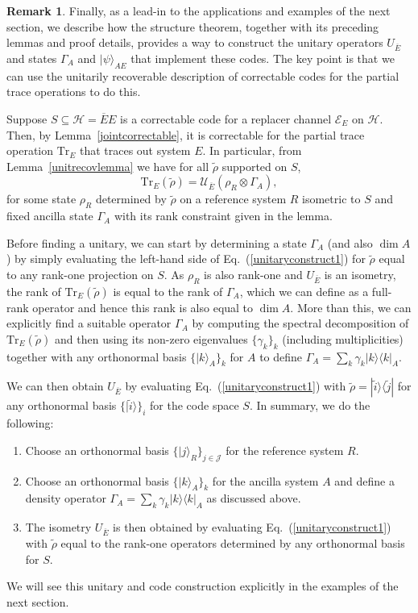 \documentclass[11pt]{amsart}
\theoremstyle{definition}
\theoremstyle{definition}
\theoremstyle{definition}
\newtheorem{remark}[thm]{Remark}
\newcommand{\tr}{\textrm{Tr}}
\newcommand{\1}{\mathbb{I}}
\def\ket#1{| #1 \rangle}
\def\kb#1#2{|#1\rangle\!\langle #2 |}
\begin{document}
\begin{remark}\label{computecoderemark}
Finally, as a lead-in to the applications and examples of the next section, we describe how the structure theorem, together with its preceding lemmas and proof details, provides a way to construct the unitary operators $U_{\overline{E}}$ and states $\Gamma_A$ and $\ket{\psi}_{A E}$ that implement these codes. The key point is that we can use the unitarily recoverable description of correctable codes for the partial trace operations to do this.  

Suppose $S \subseteq \mathcal H = \overline{E}E$ is a correctable code for a replacer channel $\mathcal{E}_E$ on $\mathcal H$. Then, by Lemma~\ref{jointcorrectable}, it is correctable for the partial trace operation $\tr_E$ that traces out system $E$. 
In particular, from Lemma~\ref{unitrecovlemma} we have for all $\widetilde{\rho}$ supported on $S$, 
\begin{equation}\label{unitaryconstruct1}
\tr_E (\widetilde{\rho}) = \mathcal{U}_{\overline{E}} (\rho_R \otimes \Gamma_A), 
\end{equation}
for some state $\rho_R$ determined by $\widetilde{\rho}$ on a reference system $R$ isometric to $S$ and fixed ancilla state $\Gamma_A$ with its rank constraint given in the lemma. 

Before finding a unitary, we can start by determining a state $\Gamma_A$ (and also $\dim A$) by simply evaluating the left-hand side of Eq.~(\ref{unitaryconstruct1}) for $\widetilde{\rho}$ equal to any rank-one projection on $S$. As $\rho_R$ is also rank-one and $U_{\overline{E}}$ is an isometry, the rank of $\tr_E (\widetilde{\rho})$ is equal to the rank of $\Gamma_A$, which we can define as a full-rank operator and hence this rank is also equal to $\dim A$. More than this, we can explicitly find a suitable operator $\Gamma_A$ by computing the spectral decomposition of $\tr_E (\widetilde{\rho})$ and then using its non-zero eigenvalues $\{ \gamma_k \}_k$ (including multiplicities) together with any orthonormal basis $\{\ket{k}_A \}_k$ for $A$ to define $\Gamma_A = \sum_k \gamma_k \kb{k}{k}_A$. 


We can then obtain $U_{\overline{E}}$ by evaluating Eq.~(\ref{unitaryconstruct1}) with $\widetilde{\rho} = \kb{\widetilde{i}}{\widetilde{j}}$ for any orthonormal basis $\{\ket{\widetilde{i}}\}_i$ for the code space $S$. 
In summary, we do the following: 
\begin{enumerate}
    \item Choose an orthonormal basis $\{\ket{j}_R\}_{j\in \mathcal{J}}$ for the reference system $R$.
    \item Choose an orthonormal basis $\{\ket{k}_A\}_k$ for the ancilla system $A$ and define a density operator $\Gamma_A = \sum_k \gamma_k \kb{k}{k}_A$ as discussed above.  
    \item The isometry $U_{\overline{E}}$ is then obtained by evaluating Eq.~(\ref{unitaryconstruct1}) with $\widetilde{\rho}$ equal to the rank-one operators determined by any orthonormal basis for $S$.  
\end{enumerate}
We will see this unitary and code construction explicitly in the examples of the next section.


\end{remark}
\end{document}
